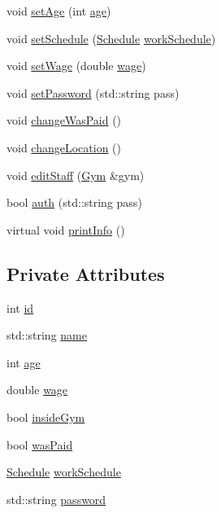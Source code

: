 \begin{DoxyCompactItemize}
\item 
void \hyperlink{classStaff_a710ece17d20ae2de66d9ed2a550b15f1}{set\+Age} (int \hyperlink{classStaff_ab36cd34fc6aa9c62ed9ca72263fd0ccc}{age})
\item 
void \hyperlink{classStaff_aa6584dd4ddea731360eb621b03a9216b}{set\+Schedule} (\hyperlink{classSchedule}{Schedule} \hyperlink{classStaff_ac2864b27c3cf1383c39916077b64b229}{work\+Schedule})
\item 
void \hyperlink{classStaff_a0a8faa8566d285282d7eb3848ea44249}{set\+Wage} (double \hyperlink{classStaff_af84be4072f59d7c5c15d7c9cc07ea002}{wage})
\item 
void \hyperlink{classStaff_aaf97f05a90562a808af9f8215b67a758}{set\+Password} (std\+::string pass)
\item 
void \hyperlink{classStaff_a70c5d5efb82fe587a69b3fe7ef44bf30}{change\+Was\+Paid} ()
\item 
void \hyperlink{classStaff_a7dc07b6a8330a7cf0117604d7cbd5138}{change\+Location} ()
\item 
void \hyperlink{classStaff_a139297bfe1533cf2b085e812365d1b38}{edit\+Staff} (\hyperlink{classGym}{Gym} \&gym)
\item 
bool \hyperlink{classStaff_a41f6fa58ad71fcb821edfbc2b838319e}{auth} (std\+::string pass)
\item 
virtual void \hyperlink{classStaff_a64b23946e927025bf5aec2938502305a}{print\+Info} ()
\end{DoxyCompactItemize}
\subsection*{Private Attributes}
\begin{DoxyCompactItemize}
\item 
int \hyperlink{classStaff_a2b5674cabb4b4e3a50cd130898d00c20}{id}
\item 
std\+::string \hyperlink{classStaff_ad0e56a6c5296a2138aed86dc0cf476cb}{name}
\item 
int \hyperlink{classStaff_ab36cd34fc6aa9c62ed9ca72263fd0ccc}{age}
\item 
double \hyperlink{classStaff_af84be4072f59d7c5c15d7c9cc07ea002}{wage}
\item 
bool \hyperlink{classStaff_a352968c949ea47dd9a278bd2d35e1fb9}{inside\+Gym}
\item 
bool \hyperlink{classStaff_ae1f9f88528e62ba09e50966a46353208}{was\+Paid}
\item 
\hyperlink{classSchedule}{Schedule} \hyperlink{classStaff_ac2864b27c3cf1383c39916077b64b229}{work\+Schedule}
\item 
std\+::string \hyperlink{classStaff_a1500c35ca5bc4a9fedd5cfb960c9bee1}{password}
\end{DoxyCompactItemize}
